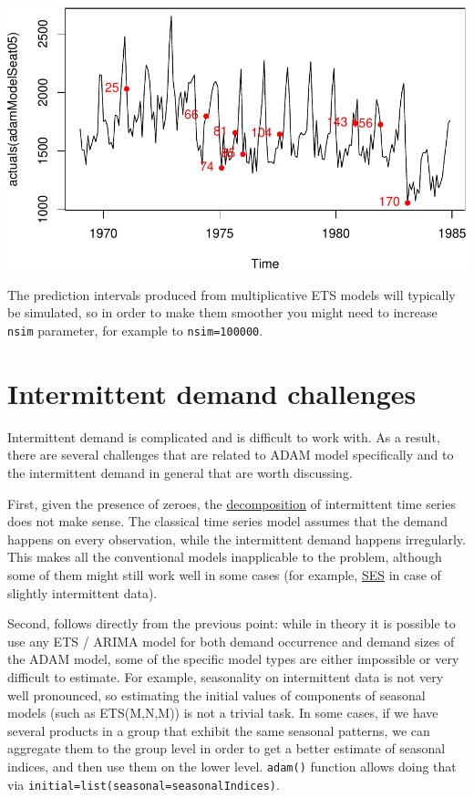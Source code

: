 \documentclass[
]{book}
\theoremstyle{definition}
\theoremstyle{definition}
\theoremstyle{definition}
\theoremstyle{definition}
\theoremstyle{remark}
\begin{document}
\includegraphics{adam_files/figure-latex/unnamed-chunk-122-1.pdf}

The prediction intervals produced from multiplicative ETS models will typically be simulated, so in order to make them smoother you might need to increase \texttt{nsim} parameter, for example to \texttt{nsim=100000}.

\hypertarget{intermittent-demand-challenges}{%
\section{Intermittent demand challenges}\label{intermittent-demand-challenges}}

Intermittent demand is complicated and is difficult to work with. As a result, there are several challenges that are related to ADAM model specifically and to the intermittent demand in general that are worth discussing.

First, given the presence of zeroes, the \protect\hyperlink{ClassicalDecomposition}{decomposition} of intermittent time series does not make sense. The classical time series model assumes that the demand happens on every observation, while the intermittent demand happens irregularly. This makes all the conventional models inapplicable to the problem, although some of them might still work well in some cases (for example, \protect\hyperlink{SES}{SES} in case of slightly intermittent data).

Second, follows directly from the previous point: while in theory it is possible to use any ETS / ARIMA model for both demand occurrence and demand sizes of the ADAM model, some of the specific model types are either impossible or very difficult to estimate. For example, seasonality on intermittent data is not very well pronounced, so estimating the initial values of components of seasonal models (such as ETS(M,N,M)) is not a trivial task. In some cases, if we have several products in a group that exhibit the same seasonal patterns, we can aggregate them to the group level in order to get a better estimate of seasonal indices, and then use them on the lower level. \texttt{adam()} function allows doing that via \texttt{initial=list(seasonal=seasonalIndices)}.
\end{document}
